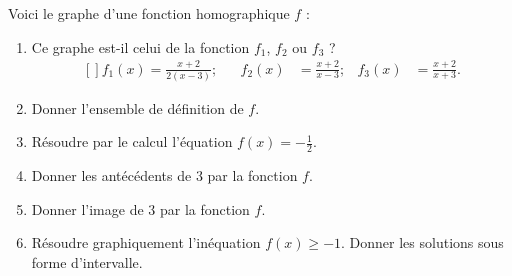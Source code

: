 
\begin{exercice}[\ldots/5]\label{exosmath-0717}

    Voici le graphe d'une fonction homographique \( f\) :

\begin{center}
   
\end{center}

\begin{enumerate}
    \item
        Ce graphe est-il celui de la fonction \( f_1\), \( f_2\) ou \( f_3\) ?
        \begin{equation}
            \begin{aligned}[]
                f_1(x)=\frac{ x+2 }{ 2(x-3) };&&f_2(x)&=\frac{ x+2 }{ x-3 };&f_3(x)&=\frac{ x+2 }{ x+3 }.
            \end{aligned}
        \end{equation}
    \item
        Donner l'ensemble de définition de \( f\).
    \item
        Résoudre par le calcul l'équation \( f(x)=-\frac{ 1 }{2}\).
    \item
        Donner les antécédents de \( 3\) par la fonction \( f\).
    \item
        Donner l'image de \( 3\) par la fonction \( f\).
    \item
        Résoudre graphiquement l'inéquation \( f(x)\geq -1\). Donner les solutions sous forme d'intervalle.
\end{enumerate}


\end{exercice}
